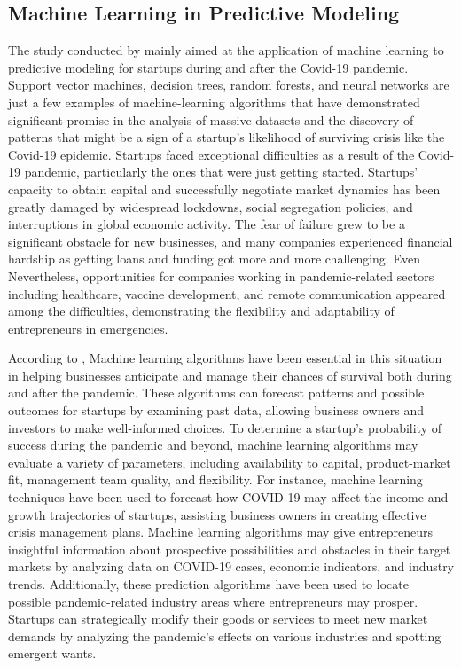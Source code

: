 \documentclass[12pt]{article}
\begin{document}
\subsection{Machine Learning in Predictive Modeling}
The study conducted by \cite{sujath2020machine} mainly aimed at the application of machine learning to predictive modeling for startups during and after the Covid-19 pandemic. Support vector machines, decision trees, random forests, and neural networks are just a few examples of machine-learning algorithms that have demonstrated significant promise in the analysis of massive datasets and the discovery of patterns that might be a sign of a startup’s likelihood of surviving crisis like the Covid-19 epidemic. Startups faced exceptional difficulties as a result of the Covid-19 pandemic, particularly the ones that were just getting started. Startups’ capacity to obtain capital and successfully negotiate market dynamics has been greatly damaged by widespread lockdowns, social segregation policies, and interruptions in global economic activity. The fear of failure grew to be a significant obstacle for new businesses, and many companies experienced financial hardship as getting loans and funding got more and more challenging. Even Nevertheless, opportunities for companies working in pandemic-related sectors including healthcare, vaccine development, and remote communication appeared among the difficulties, demonstrating the flexibility and adaptability of entrepreneurs in emergencies.

According to \citep{varma2023restarting}, Machine learning algorithms have been essential in this situation in helping businesses anticipate and manage their chances of survival both during and after the pandemic. These algorithms can forecast patterns and possible outcomes for startups by examining past data, allowing business owners and investors to make well-informed choices. To determine a startup's probability of success during the pandemic and beyond, machine learning algorithms may evaluate a variety of parameters, including availability to capital, product-market fit, management team quality, and flexibility. For instance, machine learning techniques have been used to forecast how COVID-19 may affect the income and growth trajectories of startups, assisting business owners in creating effective crisis management plans. Machine learning algorithms may give entrepreneurs insightful information about prospective possibilities and obstacles in their target markets by analyzing data on COVID-19 cases, economic indicators, and industry trends. Additionally, these prediction algorithms have been used to locate possible pandemic-related industry areas where entrepreneurs may prosper. Startups can strategically modify their goods or services to meet new market demands by analyzing the pandemic's effects on various industries and spotting emergent wants.
\end{document}
